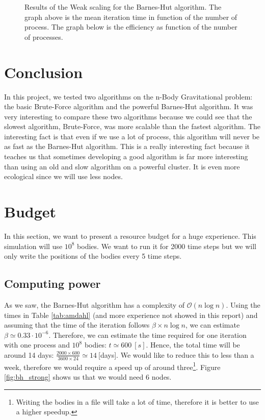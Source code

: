 \documentclass[10pt,a4paper]{article}
\begin{document}
\begin{figure}[H]
\centering

\caption{\label{fig:bh_weak} Results of the Weak scaling for the Barnes-Hut algorithm. The graph above is the mean iteration time in function of the number of process. The graph below is the efficiency as function of the number of processes.}
\end{figure}

\section{Conclusion}

In this project, we tested two algorithms on the n-Body Gravitational problem: the basic Brute-Force algorithm and the powerful Barnes-Hut algorithm. It was very interesting to compare these two algorithms because we could see that the slowest algorithm, Brute-Force, was more scalable than the fastest algorithm. The interesting fact is that even if we use a lot of process, this algorithm will never be as fast as the Barnes-Hut algorithm. This is a really interesting fact because it teaches us that sometimes developing a good algorithm is far more interesting than using an old and slow algorithm on a powerful cluster. It is even more ecological since we will use less nodes. 


\section{Budget}

In this section, we want to present a resource budget for a huge experience. This simulation will use $10^8$ bodies. We want to run it for 2000 time steps but we will only write the positions of the bodies every 5 time steps. 

\subsection{Computing power}

As we saw, the Barnes-Hut algorithm has a complexity of $\mathcal{O}(n\log n)$. Using the times in Table \ref{tab:amdahl} (and more experience not showed in this report) and assuming that the time of the iteration follows $\beta\times n\log n$, we can estimate $\beta\simeq 0.33\cdot 10^{-6}$. Therefore, we can estimate the time required for one iteration with one process and $10^8$ bodies: $t\simeq 600~[s]$. Hence, the total time will be around 14 days: $\frac{2000\times 600}{3600\times 24} \simeq 14~$[days]. We would like to reduce this to less than a week, therefore we would require a speed up of around three\footnote{Writing the bodies in a file will take a lot of time, therefore it is better to use a higher speedup.}. Figure \ref{fig:bh_strong} shows us that we would need 6 nodes.
\end{document}
